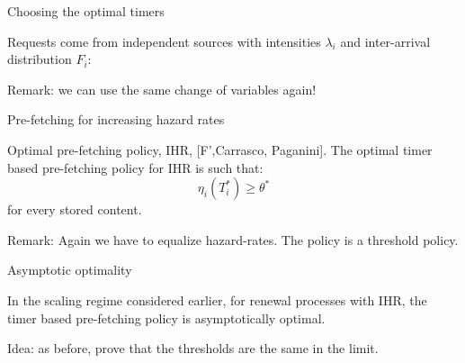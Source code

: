 \documentclass[aspectratio=169]{beamer}
\begin{document}
\begin{frame}{Choosing the optimal timers}

	Requests come from independent sources with intensities $\lambda_i$ and inter-arrival distribution $F_i$:

	\vfill

	\vfill
	\pause
	\alert{Remark:} we can use the same change of variables again!
\end{frame}

\begin{frame}{Pre-fetching for increasing hazard rates}

	\begin{block}{Optimal pre-fetching policy, IHR, [F',Carrasco, Paganini].}
		The optimal timer based pre-fetching policy for IHR is such that:
	   \begin{equation*}
		\eta_i (T_i^*) \geqslant \theta^*
	   \end{equation*}
	  for every stored content.
	   \end{block}
	  \vfill
	
	
	  \alert{Remark:} Again we have to equalize hazard-rates. The policy is a threshold policy.

\end{frame}

\begin{frame}{Asymptotic optimality}

	\begin{theorem}

		In the scaling regime considered earlier, for renewal processes with IHR, the \alert{timer based pre-fetching policy} is asymptotically optimal.
	\end{theorem}
	\vfill
	\alert{Idea:} as before, prove that the thresholds are the same in the limit.

\end{frame}
\end{document}
